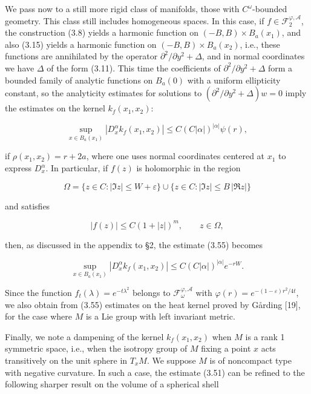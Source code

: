 We pass now to a still more rigid class of manifolds, those with $C^\omega$-bounded geometry. This class still includes homogeneous spaces. In this case, if $f\in \mathcal F_2^{\varphi,\mathcal A}$, the construction (3.8) yields a harmonic function on $(-B,B)\times B_a(x_1)$, and also (3.15) yields a harmonic function on $(-B,B)\times B_a(x_2)$, i.e., these functions are annihilated by the operator $\partial^2/\partial y^2 + \Delta$, and in normal coordinates we have $\Delta$ of the form (3.11). This time the coefficients of $\partial^2/\partial y^2 + \Delta$ form a bounded family of analytic functions on $B_a(0)$ with a uniform ellipticity constant, so the analyticity estimates for solutions to $(\partial^2/\partial y^2 + \Delta)w = 0$ imply the estimates on the kernel $k_f(x_1,x_2)$:

\begin{equation}\tag{3.55}
\sup_{x\in B_a(x_1)} |D_x^\alpha k_f(x_1,x_2)| \le C(C|\alpha|)^{|\alpha|}\psi(r),
\end{equation}

if $\rho(x_1,x_2)=r+2a$, where one uses normal coordinates centered at $x_1$ to express $D_x^\alpha$. In particular, if $f(z)$ is holomorphic in the region

\begin{equation}\tag{3.56}
\Omega = \{z\in C: |\Im z|\le W+\varepsilon\}\cup\{z\in C: |\Im z|\le B\, |\Re z|\}
\end{equation}

and satisfies

\begin{equation}\tag{3.57}
|f(z)|\le C(1+|z|)^m, \qquad z\in \Omega,
\end{equation}

then, as discussed in the appendix to \S2, the estimate (3.55) becomes

\begin{equation}\tag{3.58}
\sup_{x\in B_a(x_1)} |D_x^\alpha k_f(x_1,x_2)| \le C(C|\alpha|)^{|\alpha|} e^{-rW}.
\end{equation}

Since the function $f_t(\lambda)=e^{-t\lambda^2}$ belongs to $\mathcal F_\omega^{\varphi,\mathcal A}$ with $\varphi(r)=e^{-(1-\varepsilon)r^2/4t}$, we also obtain from (3.55) estimates on the heat kernel proved by G\aa rding [19], for the case where $M$ is a Lie group with left invariant metric.

Finally, we note a dampening of the kernel $k_f(x_1,x_2)$ when $M$ is a rank 1 symmetric space, i.e., when the isotropy group of $M$ fixing a point $x$ acts transitively on the unit sphere in $T_xM$. We suppose $M$ is of noncompact type with negative curvature. In such a case, the estimate (3.51) can be refined to the following sharper result on the volume of a spherical shell

